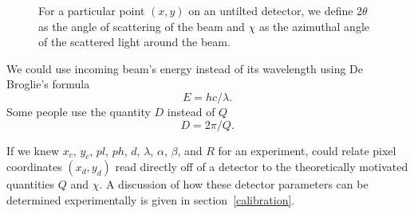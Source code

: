 \begin{SCfigure}[1][bthp]
    \centering
    
    \caption{For a particular point $(x,y)$ on an 
    untilted detector, we define $2\theta$ as the angle of 
    scattering of the beam and $\chi$ as the
    azimuthal angle of the scattered light around 
    the beam.}
    \label{TwoTheta}
\end{SCfigure}

We could use incoming beam's energy instead of its wavelength 
using De Broglie's formula
\begin{equation}
    E = hc/\lambda.
\end{equation}
Some people use the quantity $D$ instead of $Q$
\begin{equation}\label{DtermsQ}
    D = 2\pi/Q.
\end{equation}

If we knew $x_c$, $y_c$, $pl$, $ph$, $d$, $\lambda$,
$\alpha$, $\beta$, and $R$ for an experiment, could
relate pixel coordinates $(x_d,y_d)$ read directly off
of a detector to the
theoretically motivated quantities $Q$ and $\chi$.
A discussion of how these detector parameters can be 
determined experimentally
is given in section~\ref{calibration}.

